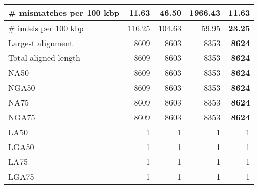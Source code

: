 \documentclass[12pt,a4paper]{article}
\begin{document}
\begin{table}[ht]
\begin{center}
\begin{tabular}{|l*{4}{|r}|}
\# mismatches per 100 kbp & {\bf 11.63} & 46.50 & 1966.43 & {\bf 11.63} \\ \hline
\# indels per 100 kbp & 116.25 & 104.63 & 59.95 & {\bf 23.25} \\ \hline
Largest alignment & 8609 & 8603 & 8353 & {\bf 8624} \\ \hline
Total aligned length & 8609 & 8603 & 8353 & {\bf 8624} \\ \hline
NA50 & 8609 & 8603 & 8353 & {\bf 8624} \\ \hline
NGA50 & 8609 & 8603 & 8353 & {\bf 8624} \\ \hline
NA75 & 8609 & 8603 & 8353 & {\bf 8624} \\ \hline
NGA75 & 8609 & 8603 & 8353 & {\bf 8624} \\ \hline
LA50 & 1 & 1 & 1 & 1 \\ \hline
LGA50 & 1 & 1 & 1 & 1 \\ \hline
LA75 & 1 & 1 & 1 & 1 \\ \hline
LGA75 & 1 & 1 & 1 & 1 \\ \hline
\end{tabular}
\end{center}
\end{table}
\end{document}

